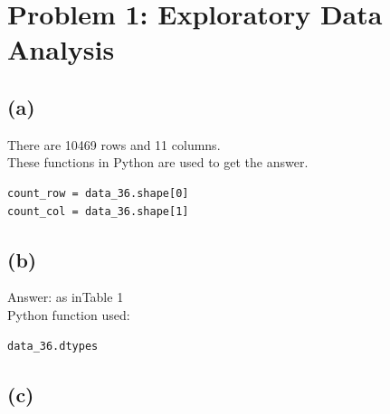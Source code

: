 \documentclass{homework}
\begin{document}
\maketitle


\section*{Problem 1: Exploratory Data Analysis}
\subsection*{(a)}
There are 10469 rows and 11 columns. \\
These functions in Python are used to get the answer. 
\begin{verbatim}
count_row = data_36.shape[0]
count_col = data_36.shape[1]
\end{verbatim}
   
\subsection*{(b)}
   Answer: as inTable 1\\
   Python function used:
   \begin{verbatim}
data_36.dtypes
\end{verbatim}

\subsection*{(c)}   
\end{document}
